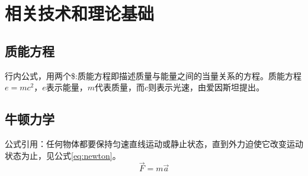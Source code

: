 
\chapter{相关技术和理论基础}



\section{质能方程}
行内公式，用两个\$:质能方程即描述质量与能量之间的当量关系的方程\cite{liuxiaopingwordandtex}。质能方程$e=mc^2$，$e$表示能量，$m$代表质量，而$c$则表示光速，由爱因斯坦提出\cite{yassin1994latex}。

\section{牛顿力学}
公式引用：任何物体都要保持匀速直线运动或静止状态\cite{liu2013latex}，直到外力迫使它改变运动状态为止，见公式\eqref{eq:newton}。
\begin{equation}\label{eq:newton}
	\vec{F}=m\vec{a} 
\end{equation}



